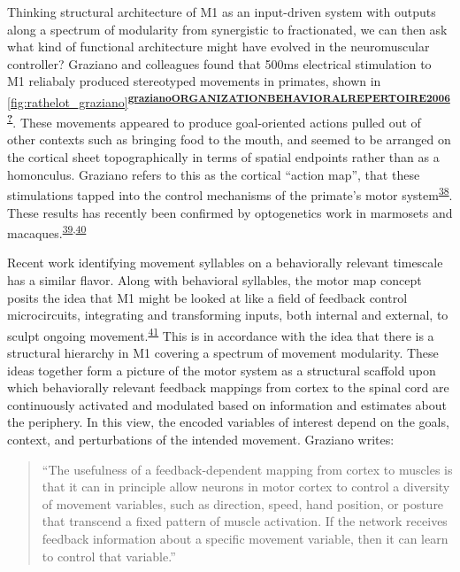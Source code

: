 \documentclass[
  a4paper,
]{article}
\begin{document}
Thinking structural architecture of M1 as an input-driven system with
outputs along a spectrum of modularity from synergistic to fractionated,
we can then ask what kind of functional architecture might have evolved
in the neuromuscular controller? Graziano and colleagues found that
500ms electrical stimulation to M1 reliabaly produced stereotyped
movements in primates, shown in
\cref{fig:rathelot_graziano}\textsuperscript{\protect\hyperlink{ref-grazianoORGANIZATIONBEHAVIORALREPERTOIRE2006}{\textbf{grazianoORGANIZATIONBEHAVIORALREPERTOIRE2006?}}}.
These movements appeared to produce goal-oriented actions pulled out of
other contexts such as bringing food to the mouth, and seemed to be
arranged on the cortical sheet topographically in terms of spatial
endpoints rather than as a homonculus. Graziano refers to this as the
cortical ``action map'', that these stimulations tapped into the control
mechanisms of the primate's motor
system\textsuperscript{\protect\hyperlink{ref-grazianoIntelligentMovementMachine2009}{38}}.
These results has recently been confirmed by optogenetics work in
marmosets and
macaques.\textsuperscript{\protect\hyperlink{ref-ebina2019}{39},\protect\hyperlink{ref-watanabeForelimbMovementsEvoked2020}{40}}

Recent work identifying movement syllables on a behaviorally relevant
timescale has a similar flavor. Along with behavioral syllables, the
motor map concept posits the idea that M1 might be looked at like a
field of feedback control microcircuits, integrating and transforming
inputs, both internal and external, to sculpt ongoing
movement.\textsuperscript{\protect\hyperlink{ref-wiltschkoMappingSubSecondStructure2015}{41}}
This is in accordance with the idea that there is a structural hierarchy
in M1 covering a spectrum of movement modularity. These ideas together
form a picture of the motor system as a structural scaffold upon which
behaviorally relevant feedback mappings from cortex to the spinal cord
are continuously activated and modulated based on information and
estimates about the periphery. In this view, the encoded variables of
interest depend on the goals, context, and perturbations of the intended
movement. Graziano writes:

\begin{quote}
``The usefulness of a feedback-dependent mapping from cortex to muscles
is that it can in principle allow neurons in motor cortex to control a
diversity of movement variables, such as direction, speed, hand
position, or posture that transcend a fixed pattern of muscle
activation. If the network receives feedback information about a
specific movement variable, then it can learn to control that
variable.''
\end{quote}
\end{document}
